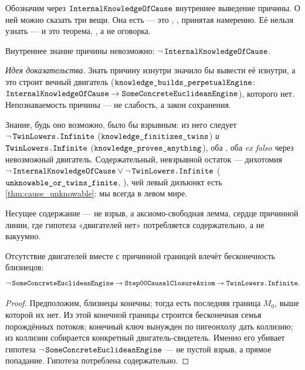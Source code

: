 Обозначим через $\texttt{InternalKnowledgeOfCause}$ внутреннее выведение причины. О ней можно сказать
три вещи. Она есть --- это \axiom{}, \yellow{}, принятая намеренно. Её нельзя узнать --- и это
теорема, \green{}, а не оговорка.

\begin{theorem}\label{thm:cause_unknowable}
\green{} Внутреннее знание причины невозможно:
$\lnot\,\texttt{InternalKnowledgeOfCause}$.
\end{theorem}

\emph{Идея доказательства.} Знать причину изнутри значило бы вывести её изнутри, а это строит вечный
двигатель ($\texttt{knowledge\_builds\_perpetualEngine}$:
$\texttt{InternalKnowledgeOfCause} \to \texttt{SomeConcreteEuclideanEngine}$), которого нет.
Непознаваемость причины --- не слабость, а закон сохранения.

Знание, будь оно возможно, было бы взрывным: из него следует $\lnot\,\texttt{TwinLowers.Infinite}$
($\texttt{knowledge\_finitizes\_twins}$) \emph{и} $\texttt{TwinLowers.Infinite}$
($\texttt{knowledge\_proves\_anything}$), оба \green{}, оба \emph{ex falso} через невозможный двигатель.
Содержательный, невзрывной остаток --- дихотомия
$\lnot\,\texttt{InternalKnowledgeOfCause} \vee \lnot\,\texttt{TwinLowers.Infinite}$
($\texttt{unknowable\_or\_twins\_finite}$, \green{}), чей левый дизъюнкт есть
\cref{thm:cause_unknowable}: мы всегда в левом мире.

Несущее содержание --- не взрыв, а аксиомо-свободная лемма, сердце причинной линии, где гипотеза
«двигателей нет» потребляется содержательно, а не вакуумно.

\begin{theorem}\label{thm:twins_infinite_of_noEngine_and_boundary}
\green{} Отсутствие двигателей вместе с причинной границей влечёт бесконечность близнецов:
\begin{equation}\label{eq:twins_infinite_of_noEngine}
\lnot\,\texttt{SomeConcreteEuclideanEngine} \to \texttt{Step00CausalClosureAxiom} \to
\texttt{TwinLowers.Infinite}.
\end{equation}
\end{theorem}

\begin{proof}
Предположим, близнецы конечны; тогда есть последняя граница $M_0$, выше которой их нет. Из этой
конечной границы строится бесконечная семья порождённых потоков; конечный ключ вынужден по пигеонхолу
дать коллизию; из коллизии собирается конкретный двигатель-свидетель. Именно его убивает гипотеза
$\lnot\,\texttt{SomeConcreteEuclideanEngine}$ --- не пустой взрыв, а прямое попадание. Гипотеза
потреблена содержательно.
\end{proof}

